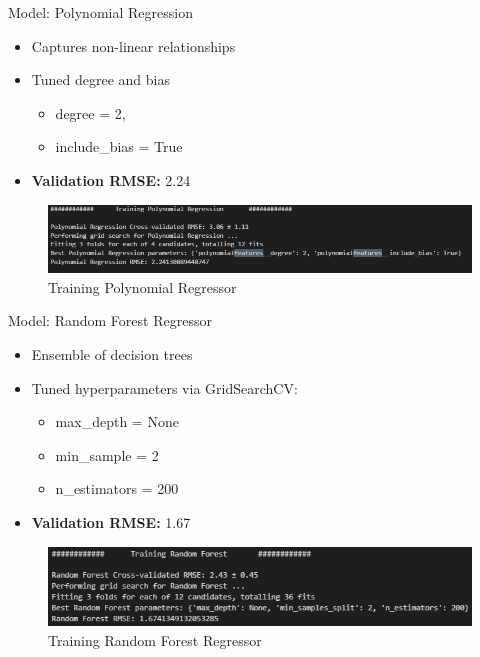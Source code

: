 \documentclass{beamer}
\begin{document}
\begin{frame}{Model: Polynomial Regression}
  \begin{itemize}
    \item Captures non-linear relationships
    \item Tuned degree and bias 
        \begin{itemize}
            \item degree = 2,
            \item include\_bias = True
        \end{itemize}  
    \item \textbf{Validation RMSE:} 2.24
  \end{itemize}
  \begin{figure}
\vfill
    \centering
    \includegraphics[width=0.6\linewidth]{images/pr.png}
    \caption{Training Polynomial Regressor}
    \label{fig:enter-label}
\end{figure}
\end{frame}

\begin{frame}{Model: Random Forest Regressor}
  \begin{itemize}
    \item Ensemble of decision trees
    \item Tuned hyperparameters via GridSearchCV:
        \begin{itemize}
            \item max\_depth = None
            \item min\_sample = 2
            \item n\_estimators = 200
        \end{itemize}  
    \item \textbf{Validation RMSE:} 1.67
  \end{itemize}
  \begin{figure}
\vfill
    \centering
    \includegraphics[width=0.6\linewidth]{images/rf.png}
    \caption{Training Random Forest Regressor}
    \label{fig:enter-label}
\end{figure}
\end{frame}
\end{document}
